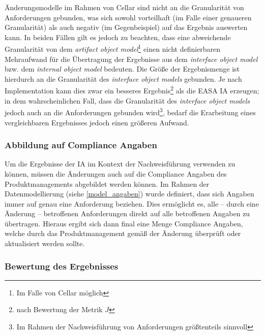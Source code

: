     \medskip
    Änderungsmodelle im Rahmen von Cellar sind nicht an die Granularität von Anforderungen gebunden, was sich sowohl vorteilhaft (im Falle einer genaueren Granularität) als auch negativ (im Gegenbeispiel) auf das Ergebnis auswerten kann.
    In beiden Fällen gilt es jedoch zu beachten, dass eine abweichende Granularität von dem \textit{artifact object model}\footnote{Im Falle von Cellar möglich} einen nicht definierbaren Mehraufwand für die Übertragung der Ergebnisse aus dem \textit{interface object model} bzw. dem \textit{internal object model} bedeuten.
    Die Größe der Ergebnismenge ist hierdurch an die Granularität des \textit{interface object models} gebunden. 
    Je nach Implementation kann dies zwar ein besseres Ergebnis\footnote{nach Bewertung der Metrik $J$} als die \ac{EASA} \ac{IA} erzeugen; in dem wahrscheinlichen Fall, dass die Granularität des \textit{interface object models} jedoch auch an die Anforderungen gebunden wird\footnote{Im Rahmen der Nachweisführung von \atmans Anforderungen größtenteils sinnvoll}, bedarf die Erarbeitung eines vergleichbaren Ergebnisses jedoch einen größeren Aufwand.  

\subsubsection{Abbildung auf Compliance Angaben}

    Um die Ergebnisse der \ac{IA} im Kontext der Nachweisführung verwenden zu können, müssen die Änderungen auch auf die Compliance Angaben des Produktmanagements abgebildet werden können.
    Im Rahmen der Datenmodellierung (siehe \ref{model_angaben}) wurde definiert, dass sich Angaben immer auf genau eine Anforderung beziehen. 
    Dies ermöglicht es, alle -- durch eine Änderung -- betroffenen Anforderungen direkt auf alle betroffenen Angaben zu übertragen.
    Hieraus ergibt sich dann final eine Menge Compliance Angaben, welche durch das Produktmanagement gemäß der Änderung überprüft oder aktualisiert werden sollte.

\pagebreak
\subsubsection{Bewertung des Ergebnisses}


